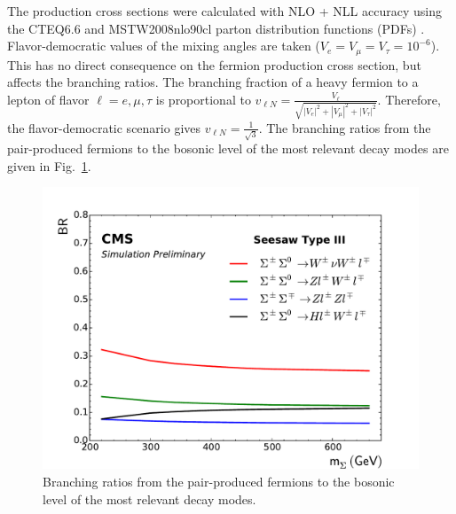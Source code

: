 The production cross sections were calculated with NLO + NLL accuracy using the CTEQ6.6 and MSTW2008nlo90cl parton distribution functions (PDFs) \cite{Fuks:2012qx,Fuks:2013vua}. Flavor-democratic values of the mixing angles are taken ($V_e = V_\mu = V_\tau = 10^{-6}$). This has no direct consequence on the fermion production cross section, but affects the branching ratios. The branching fraction of a heavy fermion to a lepton of flavor $\ell = e, \mu, \tau$ is proportional to $v_{\ell N} = \frac{V_\ell}{\sqrt{|V_e|^2 + |V_\mu|^2 + |V_\tau|^2}}$. Therefore, the flavor-democratic scenario gives $v_{\ell N} = \frac{1}{\sqrt{3}}$. The branching ratios from the pair-produced fermions to the bosonic level of the most relevant decay modes are given in Fig.~\ref{fig:SeesawBR}.

\begin{figure}
\begin{center}
	\includegraphics[width=.8\textwidth]{Theory/BR}
	\caption{Branching ratios from the pair-produced fermions to the bosonic level of the most relevant decay modes.
	\label{fig:SeesawBR}}
\end{center}
\end{figure}
